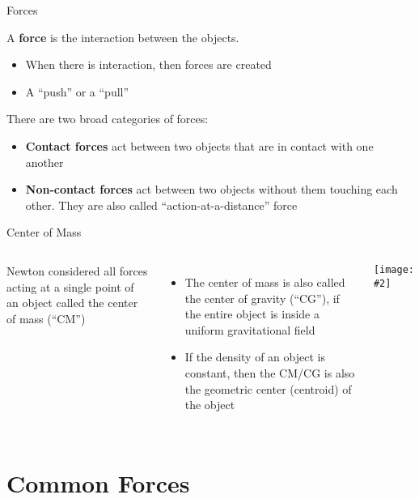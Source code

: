 \documentclass[12pt,compress,aspectratio=169]{beamer}
\newcommand{\pic}[2]{\texttt{[image: \#2]}}
\begin{document}
\begin{frame}{Forces}

  A \textbf{force} is the interaction between the objects.
  \begin{itemize}
  \item When there is interaction, then forces are created
  \item A ``push'' or a ``pull''
  \end{itemize}

  There are two broad categories of forces:
  \begin{itemize}
  \item\textbf{Contact forces} act between two objects that are in contact
    with one another
  \item\textbf{Non-contact forces} act between two objects without them
    touching each other. They are also called ``action-at-a-distance'' force
  \end{itemize}
\end{frame}



\begin{frame}{Center of Mass}
  \vspace{.2in}
  \begin{columns}
    Newton considered all forces acting at a single point of an object called
    the center of mass (``CM'')
    \begin{itemize}
    \item The center of mass is also called the center of gravity (``CG''), if
      the entire object is inside a uniform gravitational field
    \item If the density of an object is constant, then the CM/CG is also the
      geometric center (centroid) of the object
    \end{itemize}

    \pic{1}{graphics/cofm}
  \end{columns}
\end{frame}

\section{Common Forces}
\end{document}
